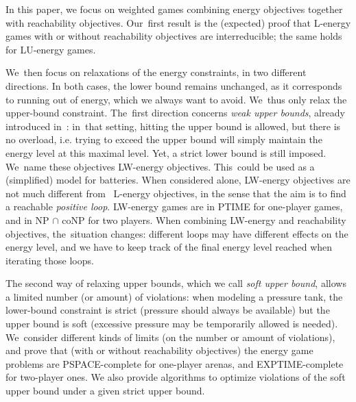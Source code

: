 In this paper, we focus on weighted games combining energy objectives
together with reachability objectives. Our~first result is the
(expected) proof that L-energy games with or without reachability
objectives are interreducible; the same holds for LU-energy games.

%
We~then focus on relaxations of the energy constraints, in two
different directions. In both cases, the lower bound remains
unchanged, as it corresponds to running out of energy, which we always
want to avoid. We~thus only relax the upper-bound constraint.
The~first direction concerns \emph{weak upper bounds}, already
introduced in~\cite{BouyerFLMS08}: in~that setting, hitting the upper bound
is allowed, but there is no overload, i.e. trying to exceed the upper bound will simply maintain the energy level at this maximal level. Yet, a strict lower bound is
still imposed. We~name these objectives LW-energy
objectives. This~could be used as a (simplified) model for batteries.
When considered alone, LW-energy objectives are not much different
from~ L-energy objectives, in the sense that the aim is to find a
reachable \emph{positive loop}. LW-energy games are in PTIME for
one-player games, and in NP $\cap$ coNP for two players. When
combining LW-energy and reachability objectives, the~situation
changes: different loops may have different effects on the energy
level, and we have to keep track of the final energy level reached
when iterating those loops.

The second way of relaxing upper bounds, which we call \emph{soft
upper bound}, allows a limited number (or amount) of
violations: when modeling a pressure tank, the lower-bound constraint
is strict (pressure should always be available) but the upper bound is
soft (excessive pressure may be temporarily allowed is
needed). We~consider different kinds of limits (on the number or
amount of violations), and prove that (with or without reachability
objectives) the energy game problems are PSPACE-complete for one-player arenas,
and EXPTIME-complete for two-player ones. We also provide algorithms to optimize violations of the soft upper bound under a given strict upper bound.

